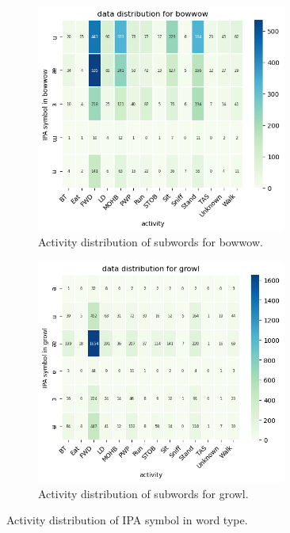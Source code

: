 \documentclass[letterpaper]{article}
\begin{document}
\begin{figure}[h]
\begin{subfigure}[]{0.4\textwidth}
	\centering
	\includegraphics[width=0.9\textwidth]{images/symbol_bowwow.png}
	\caption{Activity distribution of subwords for bowwow.}
\label{fig:51}
\end{subfigure}
\begin{subfigure}[]{0.4\textwidth}
	\centering
	\includegraphics[width=0.9\textwidth]{images/symbol_growl.png}
	\caption{Activity distribution of subwords for growl.}
	\label{fig:61}
\end{subfigure}

\caption{Activity distribution of IPA symbol in word type.}
\label{fig:activity_symbol_word_type}
\end{figure}
\end{document}
